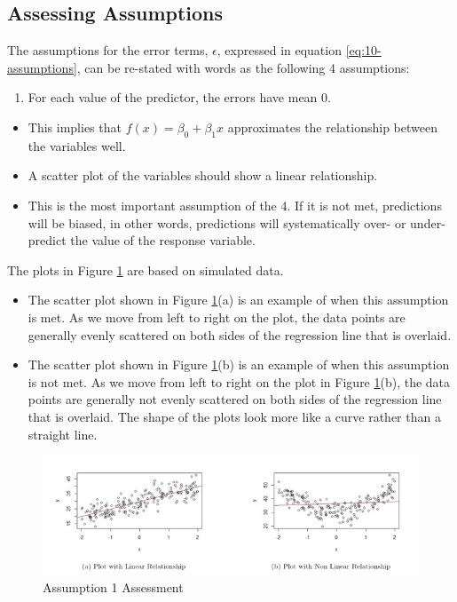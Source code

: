 \documentclass[
]{book}
\providecommand{\tightlist}{%
  \setlength{\itemsep}{0pt}\setlength{\parskip}{0pt}}
\begin{document}
\hypertarget{assessing-assumptions}{%
\subsection{Assessing Assumptions}\label{assessing-assumptions}}

The assumptions for the error terms, \(\epsilon\), expressed in equation \eqref{eq:10-assumptions}, can be re-stated with words as the following 4 assumptions:

\begin{enumerate}
\def\labelenumi{\arabic{enumi}.}
\tightlist
\item
  For each value of the predictor, the errors have mean 0.
\end{enumerate}

\begin{itemize}
\tightlist
\item
  This implies that \(f(x) = \beta_0 + \beta_1 x\) approximates the relationship between the variables well.
\item
  A scatter plot of the variables should show a linear relationship.
\item
  This is the most important assumption of the 4. If it is not met, predictions will be biased, in other words, predictions will systematically over- or under- predict the value of the response variable.
\end{itemize}

The plots in Figure \ref{fig:10-ass1} are based on simulated data.

\begin{itemize}
\item
  The scatter plot shown in Figure \ref{fig:10-ass1}(a) is an example of when this assumption is met. As we move from left to right on the plot, the data points are generally evenly scattered on both sides of the regression line that is overlaid.
\item
  The scatter plot shown in Figure \ref{fig:10-ass1}(b) is an example of when this assumption is not met. As we move from left to right on the plot in Figure \ref{fig:10-ass1}(b), the data points are generally not evenly scattered on both sides of the regression line that is overlaid. The shape of the plots look more like a curve rather than a straight line.
\end{itemize}

\begin{figure}
\centering
\includegraphics{images/10-ass1.jpg}
\caption{\label{fig:10-ass1}Assumption 1 Assessment}
\end{figure}
\end{document}
